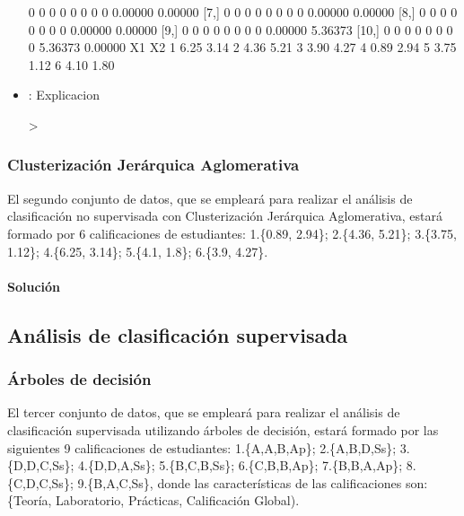\documentclass[a4paper, 12pt]{article}
\begin{document}
\begin{itemize}
\begin{Schunk}
\begin{Soutput}
 [6,]    0    0    0    0    0    0    0    0 0.00000 0.00000
 [7,]    0    0    0    0    0    0    0    0 0.00000 0.00000
 [8,]    0    0    0    0    0    0    0    0 0.00000 0.00000
 [9,]    0    0    0    0    0    0    0    0 0.00000 5.36373
[10,]    0    0    0    0    0    0    0    0 5.36373 0.00000
    X1   X2
1 6.25 3.14
2 4.36 5.21
3 3.90 4.27
4 0.89 2.94
5 3.75 1.12
6 4.10 1.80
\end{Soutput}
\end{Schunk}
		\item \texttt{}: 
		Explicacion
\begin{Schunk}
\begin{Sinput}
> 
\end{Sinput}
\end{Schunk}

		\end{itemize}
	
	
	\subsubsection{Clusterización Jerárquica Aglomerativa}
	
	El segundo conjunto de datos, que se empleará para realizar el análisis de clasificación no supervisada con Clusterización Jerárquica Aglomerativa, estará formado por 6 calificaciones de estudiantes: 1.\{0.89, 2.94\}; 2.\{4.36, 5.21\}; 3.\{3.75, 1.12\}; 4.\{6.25, 3.14\}; 5.\{4.1, 1.8\}; 6.\{3.9, 4.27\}.
	
	\paragraph{Solución}
	
	\newpage

	\subsection{Análisis de clasificación supervisada}
	
	\subsubsection{Árboles de decisión}
	
	El tercer conjunto de datos, que se empleará para realizar el análisis de clasificación supervisada utilizando árboles de decisión, estará formado por las siguientes 9 calificaciones de estudiantes: 1.\{A,A,B,Ap\}; 2.\{A,B,D,Ss\}; 3.\{D,D,C,Ss\}; 4.\{D,D,A,Ss\}; 5.\{B,C,B,Ss\}; 6.\{C,B,B,Ap\}; 7.\{B,B,A,Ap\}; 8.\{C,D,C,Ss\}; 9.\{B,A,C,Ss\}, donde las características de las calificaciones son: \{Teoría, Laboratorio, Prácticas, Calificación Global).
	
\end{document}
